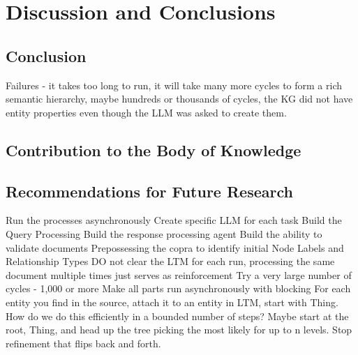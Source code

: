 \chapter{Discussion and Conclusions}
\section{Conclusion}

Failures - it takes too long to run, it will take many more cycles to form a rich semantic hierarchy, maybe hundreds or thousands of cycles, the KG did not have entity properties even though the LLM was asked to create them.

\section{Contribution to the Body of Knowledge}
\lipsum[1]

\section{Recommendations for Future Research}

Run the processes asynchronously
Create specific LLM for each task
Build the Query Processing
Build the response processing agent
Build the ability to validate documents
Prepossessing the copra to identify initial Node Labels and Relationship Types
DO not clear the LTM for each run, processing the same document multiple times just serves as reinforcement
Try a very large number of cycles - 1,000 or more
Make all parts run asynchronously with blocking
For each entity you find in the source, attach it to an entity in LTM, start with Thing. How do we do this efficiently in a bounded number of steps? Maybe start at the root, Thing, and head up the tree picking the most likely for up to n levels.
Stop refinement that flips back and forth.
